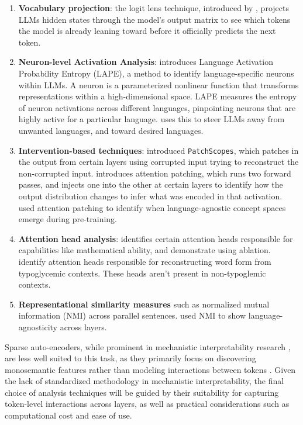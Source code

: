 \documentclass[a4paper]{article}
\begin{document}
\begin{enumerate}

\item \textbf{Vocabulary projection}: the logit lens technique, introduced by \textcite{nostalgebraist}, projects LLMs hidden states through the model's output matrix to see which tokens the model is already leaning toward before it officially predicts the next token.

\item \textbf{Neuron-level Activation Analysis}: \textcite{tang2024} introduces Language Activation Probability Entropy (LAPE), a method to identify language-specific neurons within LLMs. A neuron is a parameterized nonlinear function that transforms representations within a high-dimensional space. LAPE measures the entropy of neuron activations across different languages, pinpointing neurons that are highly active for a particular language. \textcite{gurgurov2025} uses this to steer LLMs away from unwanted languages, and toward desired languages.

\item \textbf{Intervention-based techniques}: \textcite{ghandeharioun2024} introduced \texttt{PatchScopes}, which patches in the output from certain layers using corrupted input trying to reconstruct the non-corrupted input. \textcite{dumas2025} introduces attention patching, which runs two forward passes, and injects one into the other at certain layers to identify how the output distribution changes to infer what was encoded in that activation. \textcite{korner2026} used attention patching to identify when language-agnostic concept spaces emerge during pre-training.

\item \textbf{Attention head analysis}: \textcite{zhao2025} identifies certain attention heads responsible for capabilities like mathematical ability, and demonstrate using ablation. \textcite{wang2025b} identify attention heads responsible for reconstructing word form from typoglycemic contexts. These heads aren't present in non-typoglemic contexts.

\item \textbf{Representational similarity measures} such as normalized mutual information (NMI) across parallel sentences. \textcite{basirat2025} used NMI to show language-agnosticity across layers.

\end{enumerate}

Sparse auto-encoders, while prominent in mechanistic interpretability research \parencite{shu2025, zhang2026}, are less well suited to this task, as they primarily focus on discovering monosemantic features rather than modeling interactions between tokens \parencite{templeton2024}. Given the lack of standardized methodology in mechanistic interpretability, the final choice of analysis techniques will be guided by their suitability for capturing token-level interactions across layers, as well as practical considerations such as computational cost and ease of use.
\end{document}
